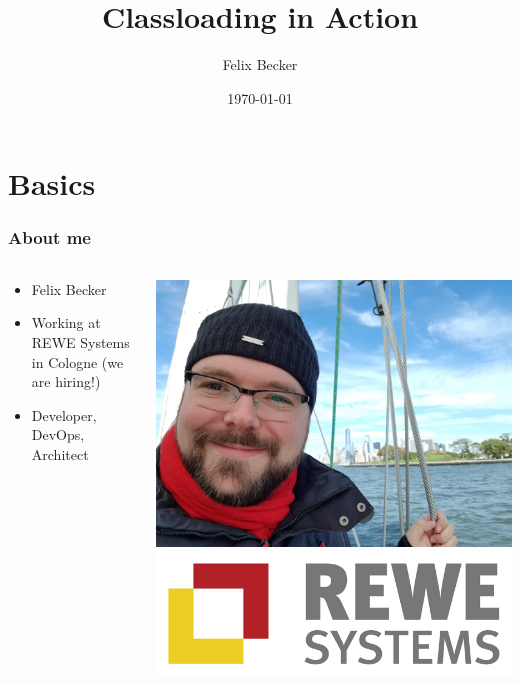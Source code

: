 \documentclass[aspectratio=169]{beamer}
\title{Classloading in Action}
\author{Felix Becker}
\date{\today}
\institute{JAX 2019}
\begin{document}
\maketitle

\section{Basics}


\begin{frame}
	\frametitle{About me}

\begin{columns}
    \begin{column}{0.68\textwidth}
		\begin{itemize}
		\item{Felix Becker}
		\item{Working at REWE Systems in Cologne (we are hiring!)}
		\item{Developer, DevOps, Architect}
		\end{itemize}
    \end{column}
    \begin{column}{0.28\textwidth}
		\includegraphics[scale=0.03]{assets/profilfoto-freizeit.jpg}
\\
\bigskip
		\includegraphics[scale=0.15]{assets/rewesyslogo.jpg}
    \end{column}
\end{columns}
\end{frame}
\end{document}
